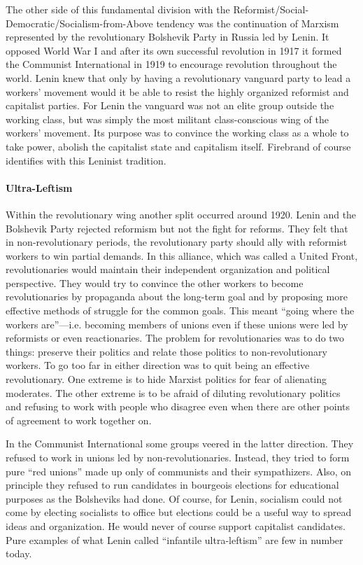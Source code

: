 The other side of this fundamental division with the Reformist/Social-Democratic/Socialism-from-Above tendency was the continuation of Marxism represented by the revolutionary Bolshevik Party in Russia led by Lenin. It opposed World War I and after its own successful revolution in 1917 it formed the Communist International in 1919 to encourage revolution throughout the world. Lenin knew that only by having a revolutionary vanguard party to lead a workers' movement would it be able to resist the highly organized reformist and capitalist parties. For Lenin the vanguard was not an elite group outside the working class, but was simply the most militant class-conscious wing of the workers' movement. Its purpose was to convince the working class as a whole to take power, abolish the capitalist state and capitalism itself. Firebrand of course identifies with this Leninist tradition.

\paragraph{Ultra-Leftism}

Within the revolutionary wing another split occurred around 1920. Lenin and the Bolshevik Party rejected reformism but not the fight for reforms. They felt that in non-revolutionary periods, the revolutionary party should ally with reformist workers to win partial demands. In this alliance, which was called a United Front, revolutionaries would maintain their independent organization and political perspective. They would try to convince the other workers to become revolutionaries by propaganda about the long-term goal and by proposing more effective methods of struggle for the common goals. This meant ``going where the workers are''---i.e. becoming members of unions even if these unions were led by reformists or even reactionaries. The problem for revolutionaries was to do two things: preserve their politics and relate those politics to non-revolutionary workers. To go too far in either direction was to quit being an effective revolutionary. One extreme is to hide Marxist politics for fear of alienating moderates. The other extreme is to be afraid of diluting revolutionary politics and refusing to work with people who disagree even when there are other points of agreement to work together on.

In the Communist International some groups veered in the latter direction. They refused to work in unions led by non-revolutionaries. Instead, they tried to form pure ``red unions'' made up only of communists and their sympathizers. Also, on principle they refused to run candidates in bourgeois elections for educational purposes as the Bolsheviks had done. Of course, for Lenin, socialism could not come by electing socialists to office but elections could be a useful way to spread ideas and organization. He would never of course support capitalist candidates. Pure examples of what Lenin called ``infantile ultra-leftism'' are few in number today.

